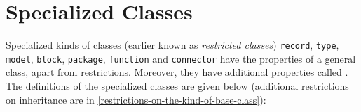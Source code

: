 \section{Specialized Classes}\label{specialized-classes}

Specialized kinds of classes (earlier known as \emph{restricted classes})
\lstinline!record!, \lstinline!type!, \lstinline!model!, \lstinline!block!, \lstinline!package!, \lstinline!function! and \lstinline!connector!
have the properties of a general class, apart from restrictions.
Moreover, they have additional properties called .
The definitions of the specialized classes are given below (additional restrictions on inheritance are in \cref{restrictions-on-the-kind-of-base-class}):
